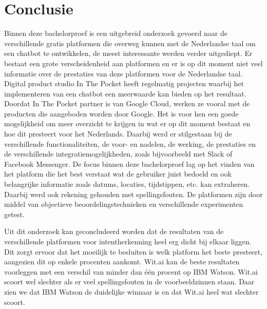 
\chapter{Conclusie}
\label{ch:conclusie}


Binnen deze bachelorproef is een uitgebreid onderzoek gevoerd naar de verschillende gratis platformen die overweg kunnen met de Nederlandse taal om een chatbot te ontwikkelen, de meest interessante werden verder uitgediept. Er bestaat een grote verscheidenheid aan platformen en er is op dit moment niet veel informatie over de prestaties van deze platformen voor de Nederlandse taal. Digital product studio In The Pocket heeft regelmatig projecten waarbij het implementeren van een chatbot een meerwaarde kan bieden op het resultaat. Doordat In The Pocket
partner is van Google Cloud, werken ze vooral met de producten die aangeboden worden door Google. Het is voor hen een goede mogelijkheid om meer overzicht te krijgen in wat er op dit moment bestaat en hoe dit presteert voor het Nederlands. Daarbij werd er stilgestaan bij de verschillende functionaliteiten, de voor- en nadelen, de werking, de prestaties en de verschillende integratiemogelijkheden, zoals bijvoorbeeld met Slack of Facebook Messenger. De focus binnen deze bachelorproef lag op het vinden van het platform die het best verstaat wat de gebruiker juist bedoeld en ook belangrijke informatie zoals datums, locaties, tijdstippen, etc. kan extraheren. Daarbij werd ook rekening gehouden met spellingsfouten. De platformen zijn door middel van objectieve beoordelingstechnieken en verschillende experimenten getest.

Uit dit onderzoek kan geconcludeerd worden dat de resultaten van de verschillende platformen voor intentherkenning heel erg dicht bij elkaar liggen. Dit zorgt ervoor dat het moeilijk te besluiten is welk platform het beste presteert, aangezien dit op enkele procenten aankomt. Wit.ai kan de beste resultaten voorleggen met een verschil van minder dan één procent op IBM Watson. Wit.ai scoort wel slechter als er veel spellingsfouten in de voorbeeldzinnen staan. Daar zien we dat IBM Watson de duidelijke winnaar is en dat Wit.ai heel wat slechter scoort.

